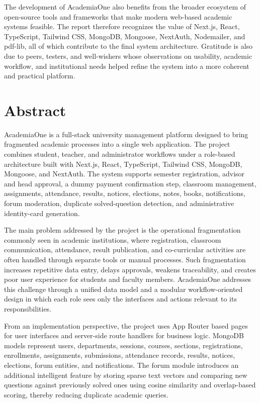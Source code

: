 \documentclass[12pt,a4paper]{report}
\newcommand{\systemName}{AcademiaOne}
\begin{document}
The development of \systemName{} also benefits from the broader ecosystem of open-source tools and frameworks that make modern web-based academic systems feasible. The report therefore recognizes the value of Next.js, React, TypeScript, Tailwind CSS, MongoDB, Mongoose, NextAuth, Nodemailer, and pdf-lib, all of which contribute to the final system architecture. Gratitude is also due to peers, testers, and well-wishers whose observations on usability, academic workflow, and institutional needs helped refine the system into a more coherent and practical platform.

\chapter*{Abstract}
\systemName{} is a full-stack university management platform designed to bring fragmented academic processes into a single web application. The project combines student, teacher, and administrator workflows under a role-based architecture built with Next.js, React, TypeScript, Tailwind CSS, MongoDB, Mongoose, and NextAuth. The system supports semester registration, advisor and head approval, a dummy payment confirmation step, classroom management, assignments, attendance, results, notices, elections, notes, books, notifications, forum moderation, duplicate solved-question detection, and administrative identity-card generation.

The main problem addressed by the project is the operational fragmentation commonly seen in academic institutions, where registration, classroom communication, attendance, result publication, and co-curricular activities are often handled through separate tools or manual processes. Such fragmentation increases repetitive data entry, delays approvals, weakens traceability, and creates poor user experience for students and faculty members. \systemName{} addresses this challenge through a unified data model and a modular workflow-oriented design in which each role sees only the interfaces and actions relevant to its responsibilities.

From an implementation perspective, the project uses App Router based pages for user interfaces and server-side route handlers for business logic. MongoDB models represent users, departments, sessions, courses, sections, registrations, enrollments, assignments, submissions, attendance records, results, notices, elections, forum entities, and notifications. The forum module introduces an additional intelligent feature by storing sparse text vectors and comparing new questions against previously solved ones using cosine similarity and overlap-based scoring, thereby reducing duplicate academic queries.
\end{document}
